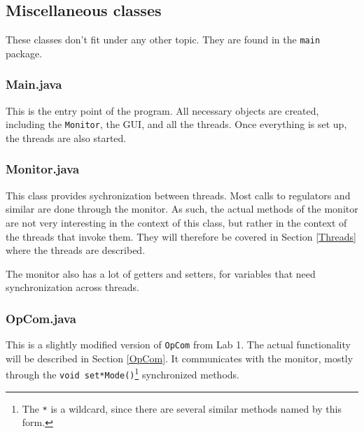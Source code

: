 


\subsection{Miscellaneous classes} 	%
These classes don't fit under any other topic. They are found in the \texttt{main} package.

\subsubsection{Main.java}
This is the entry point of the program. 
All necessary objects are created, including the \texttt{Monitor}, the GUI, and all the threads.  
Once everything is set up, the threads are also started. 

\subsubsection{Monitor.java}
This class provides sychronization between threads. Most calls to regulators and similar are done through the monitor. 
As such, the actual methods of the monitor are not very interesting in the context of this class, but rather in the context of the threads that invoke them. 
They will therefore be covered in Section \ref{Threads} where the threads are described.

The monitor also has a lot of getters and setters, for variables that need synchronization across threads.

\subsubsection{OpCom.java}
This is a slightly modified version of \texttt{OpCom} from Lab 1. 
The actual functionality will be described in Section \ref{OpCom}. 
It communicates with the monitor, mostly through the \texttt{void set*Mode()}\footnote{The \texttt{*} is a wildcard, since there are several similar methods named by this form.} synchronized methods.



